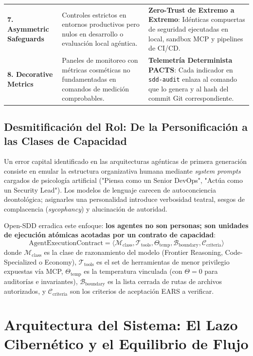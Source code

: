 \documentclass[11pt,a4paper]{article}
\begin{document}
\begin{table}[h!]
{\begin{tabular}{@{}lp{5.5cm}p{7.5cm}@{}}
\textbf{7. Asymmetric Safeguards} & Controles estrictos en entornos productivos pero nulos en desarrollo o evaluación local agéntica. & \textbf{Zero-Trust de Extremo a Extremo}: Idénticas compuertas de seguridad ejecutadas en local, sandbox MCP y pipelines de CI/CD. \\
\textbf{8. Decorative Metrics} & Paneles de monitoreo con métricas cosméticas no fundamentadas en comandos de medición comprobables. & \textbf{Telemetría Determinista PACTS}: Cada indicador en \texttt{sdd-audit} enlaza al comando que lo genera y al hash del commit Git correspondiente. \\ \bottomrule
\end{tabular}%
}
\end{table}

\subsection{Desmitificación del Rol: De la Personificación a las Clases de Capacidad}
Un error capital identificado en las arquitecturas agénticas de primera generación consiste en emular la estructura organizativa humana mediante \textit{system prompts} cargados de psicología artificial ("Piensa como un Senior DevOps", "Actúa como un Security Lead"). Los modelos de lenguaje carecen de autoconciencia deontológica; asignarles una personalidad introduce verbosidad teatral, sesgos de complacencia (\textit{sycophancy}) y alucinación de autoridad.

Open-SDD erradica este enfoque: \textbf{los agentes no son personas; son unidades de ejecución atómicas acotadas por un contrato de capacidad}:
\begin{equation}
    \text{AgentExecutionContract} = \langle \mathcal{M}_{\text{class}}, \mathcal{T}_{\text{tools}}, \Theta_{\text{temp}}, \mathcal{B}_{\text{boundary}}, \mathcal{C}_{\text{criteria}} \rangle
\end{equation}
donde $\mathcal{M}_{\text{class}}$ es la clase de razonamiento del modelo (Frontier Reasoning, Code-Specialized o Economy), $\mathcal{T}_{\text{tools}}$ es el set de herramientas de menor privilegio expuestas vía MCP, $\Theta_{\text{temp}}$ es la temperatura vinculada (con $\Theta=0$ para auditorías e invariantes), $\mathcal{B}_{\text{boundary}}$ es la lista cerrada de rutas de archivos autorizados, y $\mathcal{C}_{\text{criteria}}$ son los criterios de aceptación EARS a verificar.

\section{Arquitectura del Sistema: El Lazo Cibernético y el Equilibrio de Flujo}
\end{document}
